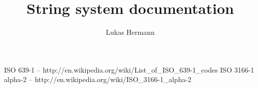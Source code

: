 \documentclass[12pt, a4paper]{article}
\begin{document}
\title{String system documentation}
\author{Lukas Hermann}
\maketitle

\tableofcontents

\newpage



\begin{thebibliography}{9}
ISO 639-1 -- http://en.wikipedia.org/wiki/List\_of\_ISO\_639-1\_codes
ISO 3166-1 alpha-2 -- http://en.wikipedia.org/wiki/ISO\_3166-1\_alpha-2
\end{thebibliography}
\end{document}
